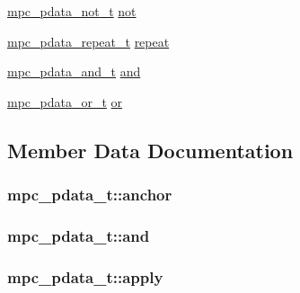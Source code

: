 \begin{DoxyCompactItemize}
\item 
\hyperlink{structmpc__pdata__not__t}{mpc\+\_\+pdata\+\_\+not\+\_\+t} \hyperlink{unionmpc__pdata__t_a231c216ce5f451a8435315bc8dfbd10e}{not}
\item 
\hyperlink{structmpc__pdata__repeat__t}{mpc\+\_\+pdata\+\_\+repeat\+\_\+t} \hyperlink{unionmpc__pdata__t_a8e367549f2d67e792c8dc16388840ae2}{repeat}
\item 
\hyperlink{structmpc__pdata__and__t}{mpc\+\_\+pdata\+\_\+and\+\_\+t} \hyperlink{unionmpc__pdata__t_aabaa920cabe246f266e8e941189be217}{and}
\item 
\hyperlink{structmpc__pdata__or__t}{mpc\+\_\+pdata\+\_\+or\+\_\+t} \hyperlink{unionmpc__pdata__t_afd52852dd436370c1c4973988a17d500}{or}
\end{DoxyCompactItemize}


\subsection{Member Data Documentation}
\hypertarget{unionmpc__pdata__t_ae224a8e37941b33eb21986baad3939aa}{}
\subsubsection[{anchor}]{ mpc\+\_\+pdata\+\_\+t\+::anchor}\label{unionmpc__pdata__t_ae224a8e37941b33eb21986baad3939aa}
\hypertarget{unionmpc__pdata__t_aabaa920cabe246f266e8e941189be217}{}
\subsubsection[{and}]{ mpc\+\_\+pdata\+\_\+t\+::and}\label{unionmpc__pdata__t_aabaa920cabe246f266e8e941189be217}
\hypertarget{unionmpc__pdata__t_a7b98c42433fe2196bbc7ac11286638d1}{}
\subsubsection[{apply}]{ mpc\+\_\+pdata\+\_\+t\+::apply}\label{unionmpc__pdata__t_a7b98c42433fe2196bbc7ac11286638d1}
\hypertarget{unionmpc__pdata__t_a643003accb3a7fa3fd82500672e57792}{}
